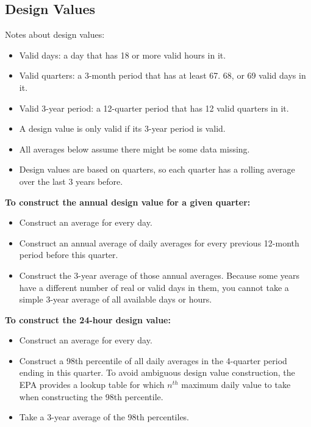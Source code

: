 \documentclass[12pt]{article}
\begin{document}
% 
















\newpage
\subsection{Design Values}
\label{sec:design_values}

Notes about design values:
\begin{itemize}
\setlength{\itemsep}{0.5em}
    \item Valid days: a day that has 18 or more valid hours in it.
    \item Valid quarters: a 3-month period that has at least 67. 68, or 69 valid days in it.
    \item Valid 3-year period: a 12-quarter period that has 12 valid quarters in it.
    \item A design value is only valid if its 3-year period is valid.
    \item All averages below assume there might be some data missing.
    \item Design values are based on quarters, so each quarter has a rolling average over the last 3 years before.
\end{itemize}
%
\textbf{To construct the annual design value for a given quarter:}
\begin{itemize}
    \item Construct an average for every day.
    \item Construct an annual average of daily averages for every previous 12-month period before this quarter.
    \item Construct the 3-year average of those annual averages. Because some years have a different number of real or valid days in them, you cannot take a simple 3-year average of all available days or hours.
\end{itemize}
%
\textbf{To construct the 24-hour design value:}
\begin{itemize}
    \item Construct an average for every day.
    \item Construct a 98th percentile of all daily averages in the 4-quarter period ending in this quarter. To avoid ambiguous design value construction, the EPA provides a lookup table for which $n^{th}$ maximum daily value to take when constructing the 98th percentile.
    \item Take a 3-year average of the 98th percentiles.
\end{itemize}
\end{document}
